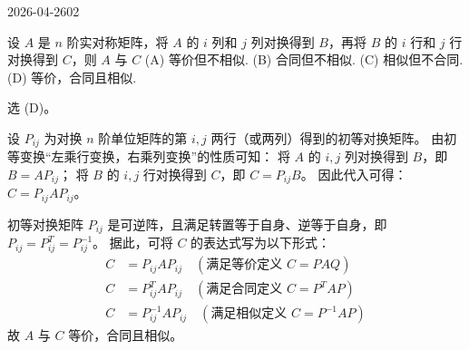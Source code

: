 \begin{mistake}{2026-04-26}{02}

\begin{problemcontent}
设 \(A\) 是 \(n\) 阶实对称矩阵，将 \(A\) 的 \(i\) 列和 \(j\) 列对换得到 \(B\)，再将 \(B\) 的 \(i\) 行和 \(j\) 行对换得到 \(C\)，则 \(A\) 与 \(C\)
(A) 等价但不相似.
(B) 合同但不相似.
(C) 相似但不合同.
(D) 等价，合同且相似.
\end{problemcontent}

\begin{solutioncontent}
选 (D)。

设 \(P_{ij}\) 为对换 \(n\) 阶单位矩阵的第 \(i, j\) 两行（或两列）得到的初等对换矩阵。
由初等变换“左乘行变换，右乘列变换”的性质可知：
将 \(A\) 的 \(i, j\) 列对换得到 \(B\)，即 \(B = AP_{ij}\)；
将 \(B\) 的 \(i, j\) 行对换得到 \(C\)，即 \(C = P_{ij}B\)。
因此代入可得：\(C = P_{ij}AP_{ij}\)。

初等对换矩阵 \(P_{ij}\) 是可逆阵，且满足转置等于自身、逆等于自身，即 \(P_{ij} = P_{ij}^T = P_{ij}^{-1}\)。
据此，可将 \(C\) 的表达式写为以下形式：
\[
\begin{aligned}
C &= P_{ij} A P_{ij} \quad (\text{满足等价定义 } C=PAQ) \\
C &= P_{ij}^T A P_{ij} \quad (\text{满足合同定义 } C=P^TAP) \\
C &= P_{ij}^{-1} A P_{ij} \quad (\text{满足相似定义 } C=P^{-1}AP)
\end{aligned}
\]
故 \(A\) 与 \(C\) 等价，合同且相似。
\end{solutioncontent}


\end{mistake}
